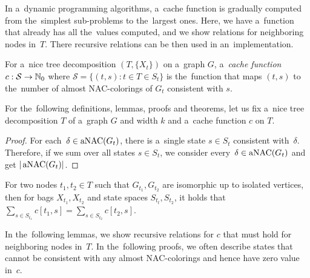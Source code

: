 In a~dynamic programming algorithms, a~cache function is gradually computed
from the~simplest sub-problems to the~largest ones.
Here, we have a~function that already has all the~values computed,
and we show relations for neighboring nodes in~\( T \).
There recursive relations can be then used in an~implementation.
%
\begin{definition}
	For a~nice tree decomposition \( (T, \{X_t\}) \) on a~graph \( G \),
	a~\emph{cache function} \( c: \mathcal{S} \to \mathbb{N}_0 \)
	where \( \mathcal{S} = \{ (t,s): t \in T \in S_t \} \)
	is the~function that maps \( (t, s) \)
	to the~number of almost NAC-colorings of \( G_t \) consistent with \( s \).
\end{definition}
%
For the~following definitions, lemmas, proofs and theorems, let us fix
a~nice tree decomposition \( T \) of a~graph \( G \) and width \( k \)
and a~cache function \( c \) on \( T \).
%
%
\begin{proof}
	For each~\( \delta \in \operatorname{aNAC}(G_t) \),
	there is a~single state \( s \in S_t \) consistent with~\( \delta \).
	Therefore, if we sum over all states \( s \in S_t \),
	we consider every~\( \delta \in \operatorname{aNAC}(G_t) \) and get \( |\operatorname{aNAC}(G_t)| \).
\end{proof}
%
\begin{observation}
	For two nodes \( t_1, t_2 \in T \) such that \( G_{t_1}, G_{t_2} \)
	are isomorphic up to isolated vertices,
	then for bags \( X_{t_1}, X_{t_2} \) and state spaces \( S_{t_t}, S_{t_2} \),
	it holds that \( \sum_{s \in S_{t_1}} c[t_1, s] = \sum_{s \in S_{t_2}} c[t_2, s] \).
\end{observation}
%
%

In the~following lemmas, we show recursive relations for \( c \) that must hold
for neighboring nodes in~\( T \).
%
In the~following proofs,
we often describe states that cannot be consistent with
any almost NAC-colorings and hence have zero value in~\( c \).

